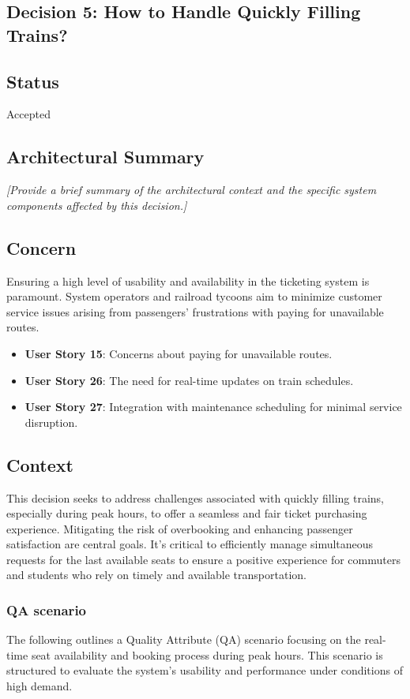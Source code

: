 \subsection{Decision 5: How to Handle Quickly Filling Trains?}

\subsection*{Status}
Accepted

\subsection*{Architectural Summary}
\textit{[Provide a brief summary of the architectural context and the specific system components affected by this decision.]}

\subsection*{Concern}
Ensuring a high level of usability and availability in the ticketing system is paramount. System operators and railroad tycoons aim to minimize customer service issues arising from passengers' frustrations with paying for unavailable routes.
\begin{itemize}
    \item \textbf{User Story 15}: Concerns about paying for unavailable routes.
    \item \textbf{User Story 26}: The need for real-time updates on train schedules.
    \item \textbf{User Story 27}: Integration with maintenance scheduling for minimal service disruption.
\end{itemize}

\subsection*{Context}
This decision seeks to address challenges associated with quickly filling trains, especially during peak hours, to offer a seamless and fair ticket purchasing experience. Mitigating the risk of overbooking and enhancing passenger satisfaction are central goals. It's critical to efficiently manage simultaneous requests for the last available seats to ensure a positive experience for commuters and students who rely on timely and available transportation.

\subsubsection*{QA scenario}
The following outlines a Quality Attribute (QA) scenario focusing on the real-time seat availability and booking process during peak hours. This scenario is structured to evaluate the system's usability and performance under conditions of high demand.
